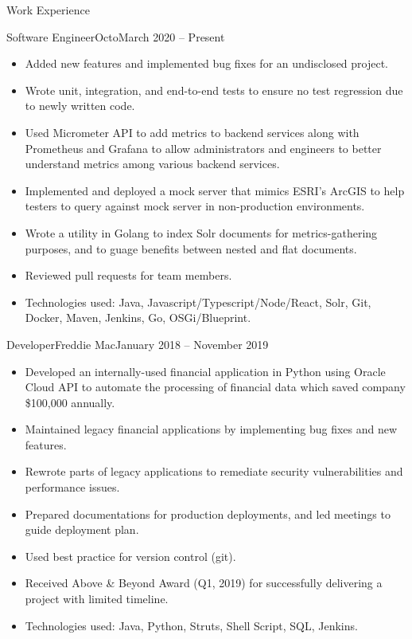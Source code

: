 \documentclass[]{mcdowellcv}
\begin{document}
	\begin{cvsection}{Work Experience}
		\begin{cvsubsection}{Software Engineer}{Octo}{March 2020 -- Present}
			\begin{itemize}
        \item Added new features and implemented bug fixes for an undisclosed project.
        \item Wrote unit, integration, and end-to-end tests to ensure no test regression due to newly written code.
				\item Used Micrometer API to add metrics to backend services along with
          Prometheus and Grafana to allow administrators and engineers to better
          understand metrics among various backend services.
				\item Implemented and deployed a mock server that mimics ESRI's ArcGIS to help
          testers to query against mock server in non-production environments.
				\item Wrote a utility in Golang to index Solr documents for metrics-gathering purposes, and to guage benefits between nested and flat documents.
        \item Reviewed pull requests for team members.
        \item Technologies used: Java, Javascript/Typescript/Node/React, Solr,
          Git, Docker, Maven, Jenkins, Go, OSGi/Blueprint.
			\end{itemize}
		\end{cvsubsection}
		
		\begin{cvsubsection}{Developer}{Freddie Mac}{January 2018 -- November 2019}	
			\begin{itemize}
				\item Developed an internally-used financial application in Python using
          Oracle Cloud API to automate the processing of financial data which
          saved company \$100,000 annually.
				\item Maintained legacy financial applications by implementing bug fixes and new features.
        \item Rewrote parts of legacy applications to remediate security vulnerabilities and performance issues.
        \item Prepared documentations for production deployments, and led meetings to guide deployment plan.
        \item Used best practice for version control (git).
        \item Received Above \& Beyond Award (Q1, 2019) for successfully delivering a project with limited timeline.
        \item Technologies used: Java, Python, Struts, Shell Script, SQL, Jenkins.
			\end{itemize}
		\end{cvsubsection}
	\end{cvsection}
	
\end{document}
